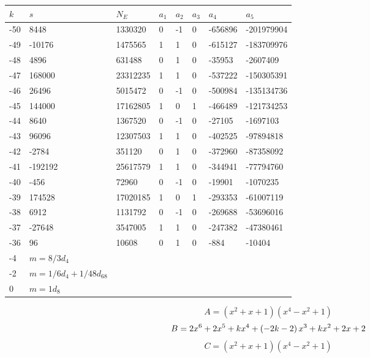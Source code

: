 \documentclass{amsart}
\begin{document}
\begin{longtable}{|l|l|l|lllll|}
\hline
$k$ & $s$ & $N_E$ & $a_1$ & $a_2$ & $a_3$ & $a_4$ & $a_5$\\
\hline
-50&8448&1330320&0&-1&0&-656896&-201979904\\
-49&-10176&1475565&1&1&0&-615127&-183709976\\
-48&4896&631488&0&1&0&-35953&-2607409\\
-47&168000&23312235&1&1&0&-537222&-150305391\\
-46&26496&5015472&0&-1&0&-500984&-135134736\\
-45&144000&17162805&1&0&1&-466489&-121734253\\
-44&8640&1367520&0&-1&0&-27105&-1697103\\
-43&96096&12307503&1&1&0&-402525&-97894818\\
-42&-2784&351120&0&1&0&-372960&-87358092\\
-41&-192192&25617579&1&1&0&-344941&-77794760\\
-40&-456&72960&0&-1&0&-19901&-1070235\\
-39&174528&17020185&1&0&1&-293353&-61007119\\
-38&6912&1131792&0&-1&0&-269688&-53696016\\
-37&-27648&3547005&1&1&0&-247382&-47380461\\
-36&96&10608&0&1&0&-884&-10404\\
-4&$m=8/3d_{4}$&&\multicolumn{5}{c|}{}\\
-2&$m=1/6d_{4}+1/48d_{68}$&&\multicolumn{5}{c|}{}\\
0&$m=1d_{8}$&&\multicolumn{5}{c|}{}\\
\hline
\end{longtable}
$$A=(x^2
 + x
 + 1)(x^4
 - x^2
 + 1)$$
$$B=2\*x^6
 + 2\*x^5
 + k\*x^4
 + \left(-2\*k
 - 2\right) \*x^3
 + k\*x^2
 + 2\*x
 + 2$$
$$C=(x^2
 + x
 + 1)(x^4
 - x^2
 + 1)$$
\end{document}
